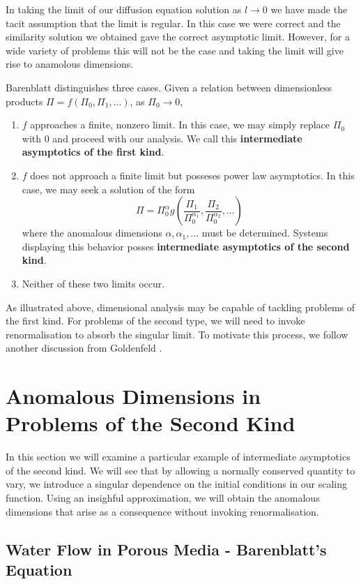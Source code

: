 In taking the limit of our diffusion equation solution  as $l \to 0$ we have made the
tacit assumption that the limit is regular.  In this case we were correct and the similarity
solution we obtained gave the correct asymptotic limit.  However, for a wide variety of
problems this will not be the case and taking the limit will give rise to anamolous dimensions.

Barenblatt \cite{Barenblatt1996} distinguishes three cases.  Given a relation between
dimensionless products $\Pi = f(\Pi_0, \Pi_1,...)$, as $\Pi_0 \to 0$,
\begin{enumerate}
\item $f$ approaches a finite, nonzero limit.  In this case, we may simply replace $\Pi_0$
with 0 and proceed with our analysis.  We call this \textbf{intermediate asymptotics of the
first kind}.
\item $f$ does not approach a finite limit but posseses power law asymptotics.
In this case, we may seek a solution of the form
\[\Pi = \Pi_0^\alpha g(\frac{\Pi_1}{\Pi_0^{\alpha_1}},\frac{\Pi_2}{\Pi_0^{\alpha_2}},...)\]
where the anomalous dimensions $\alpha, \alpha_1, ...$ must be determined.  Systems
displaying this behavior posses \textbf{intermediate asymptotics of the second kind}.
\item Neither of these two limits occur.
\end{enumerate}
As illustrated above, dimensional analysis may be capable of tackling problems of the first
kind.  For problems of the second type, we will need to invoke renormalisation to absorb
the singular limit.  To motivate this process, we follow another discussion from Goldenfeld
\cite{Goldenfeld1992}.

\section{Anomalous Dimensions in Problems of the Second Kind}

In this section we will examine a particular example of intermediate asymptotics of the 
second kind.  We will see that by allowing a normally conserved quantity to vary, we
introduce a singular dependence on the initial conditions in our scaling function.  Using
an insighful approximation, we will obtain the anomalous dimensions that arise as a
consequence without invoking renormalisation.

\subsection{Water Flow in Porous Media - Barenblatt's Equation}

